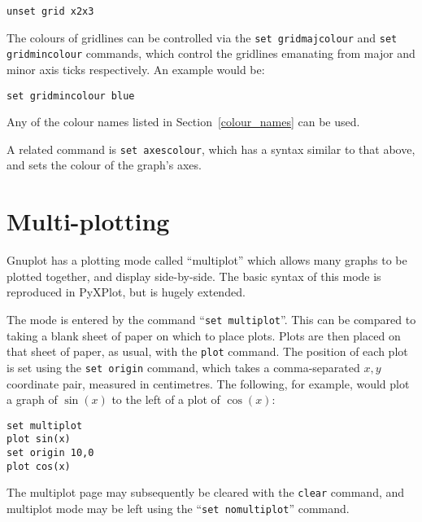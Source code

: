 \documentclass[a4paper,onecolumn,11pt]{book}
\begin{document}
\begin{verbatim}
unset grid x2x3
\end{verbatim}

The colours of gridlines can be controlled via the \texttt{set
gridmajcolour} and \texttt{set gridmincolour}
commands, which control the gridlines emanating from major and minor axis ticks
respectively. An example would be:

\begin{verbatim}
set gridmincolour blue
\end{verbatim}

\noindent Any of the colour names listed in Section~\ref{colour_names} can be
used.

A related command is \texttt{set
axescolour}, which has a syntax similar
to that above, and sets the colour of the graph's axes.
\label{set_colours}

\section{Multi-plotting}
\label{multiplot}

Gnuplot has a plotting mode called ``multiplot'' which allows many graphs to be
plotted together, and display side-by-side. The basic syntax of this mode is
reproduced in PyXPlot, but is hugely extended.

The mode is entered by the command ``\texttt{set multiplot}''. This can be compared
to taking a blank sheet of paper on which to place plots. Plots are then placed
on that sheet of paper, as usual, with the \texttt{plot} command. The position
of each plot is set using the \texttt{set origin} command, which takes a
comma-separated $x,y$ coordinate pair, measured in centimetres. The following,
for example, would plot a graph of $\sin(x)$ to the left of a plot of
$\cos(x)$:

\begin{verbatim} 
set multiplot
plot sin(x)
set origin 10,0
plot cos(x)
\end{verbatim}

The multiplot page may subsequently be cleared with the \texttt{clear} command,
and multiplot mode may be left using the ``\texttt{set nomultiplot}''
command.
\end{document}
